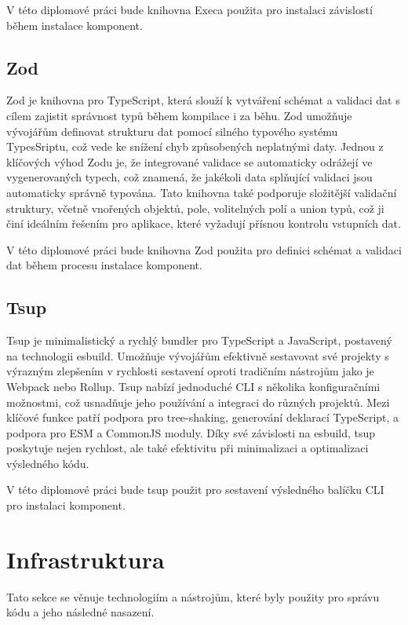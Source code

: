 V této diplomové práci bude knihovna Execa použita pro instalaci závislostí během instalace komponent.

\subsection{Zod}
Zod je knihovna pro TypeScript, která slouží k vytváření schémat a validaci dat s cílem zajistit správnost typů během kompilace i za běhu. Zod umožňuje vývojářům definovat strukturu dat pomocí silného typového systému TypesSriptu, což vede ke snížení chyb způsobených neplatnými daty. Jednou z klíčových výhod Zodu je, že integrované validace se automaticky odrážejí ve vygenerovaných typech, což znamená, že jakékoli data splňující validaci jsou automaticky správně typována. Tato knihovna také podporuje složitější validační struktury, včetně vnořených objektů, pole, volitelných polí a union typů, což ji činí ideálním řešením pro aplikace, které vyžadují přísnou kontrolu vstupních dat. \cite{Zod}

V této diplomové práci bude knihovna Zod použita pro definici schémat a validaci dat během procesu instalace komponent.

\subsection{Tsup}
Tsup je minimalistický a rychlý bundler pro TypeScript a JavaScript, postavený na technologii esbuild. Umožňuje vývojářům efektivně sestavovat své projekty s výrazným zlepšením v rychlosti sestavení oproti tradičním nástrojům jako je Webpack nebo Rollup. Tsup nabízí jednoduché CLI s několika konfiguračními možnostmi, což usnadňuje jeho používání a integraci do různých projektů. Mezi klíčové funkce patří podpora pro tree-shaking, generování deklarací TypeScript, a podpora pro ESM a CommonJS moduly. Díky své závislosti na esbuild, tsup poskytuje nejen rychlost, ale také efektivitu při minimalizaci a optimalizaci výsledného kódu.  \cite{Tsup}

V této diplomové práci bude tsup použit pro sestavení výsledného balíčku CLI pro instalaci komponent.

\section{Infrastruktura}
Tato sekce se věnuje technologiím a nástrojům, které byly použity pro správu kódu a jeho následné nasazení.

